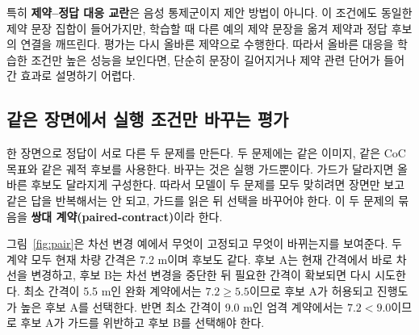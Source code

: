 특히 \textbf{제약--정답 대응 교란}은 음성 통제군이지 제안 방법이 아니다. 이 조건에도 동일한 제약 문장 집합이 들어가지만, 학습할 때 다른 예의 제약 문장을 옮겨 제약과 정답 후보의 연결을 깨뜨린다. 평가는 다시 올바른 제약으로 수행한다. 따라서 올바른 대응을 학습한 조건만 높은 성능을 보인다면, 단순히 문장이 길어지거나 제약 관련 단어가 들어간 효과로 설명하기 어렵다.


\subsection{같은 장면에서 실행 조건만 바꾸는 평가}

한 장면으로 정답이 서로 다른 두 문제를 만든다. 두 문제에는 같은 이미지, 같은 CoC 목표와 같은 궤적 후보를 사용한다. 바꾸는 것은 실행 가드뿐이다. 가드가 달라지면 올바른 후보도 달라지게 구성한다. 따라서 모델이 두 문제를 모두 맞히려면 장면만 보고 같은 답을 반복해서는 안 되고, 가드를 읽은 뒤 선택을 바꾸어야 한다. 이 두 문제의 묶음을 \textbf{쌍대 계약(paired-contract)}이라 한다.

그림~\ref{fig:pair}은 차선 변경 예에서 무엇이 고정되고 무엇이 바뀌는지를 보여준다. 두 계약 모두 현재 차량 간격은 7.2 m이며 후보도 같다. 후보 A는 현재 간격에서 바로 차선을 변경하고, 후보 B는 차선 변경을 중단한 뒤 필요한 간격이 확보되면 다시 시도한다. 최소 간격이 5.5 m인 완화 계약에서는 $7.2 \geq 5.5$이므로 후보 A가 허용되고 진행도가 높은 후보 A를 선택한다. 반면 최소 간격이 9.0 m인 엄격 계약에서는 $7.2 < 9.0$이므로 후보 A가 가드를 위반하고 후보 B를 선택해야 한다.

